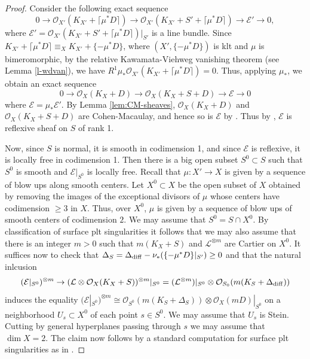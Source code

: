 \documentclass[12pt]{amsart}
\theoremstyle{plain}
\theoremstyle{remark}
\theoremstyle{definition}
\newcommand{\<}{\leq}
\def\>{\geq}
\newcommand{\OO}{{\mathcal{O}}}
\def\>{\geq}
\def\dim{\operatorname{dim}}
\theoremstyle{definition}
\theoremstyle{definition}
\numberwithin{equation}{section}
\theoremstyle{remark}
\begin{document}
\begin{proof}
    
     Consider the following exact sequence
    \[0\to \OO _{X'}(K_{X'}+\lceil \mu ^* D\rceil )\to \OO _{X'}(K_{X'}+S'+\lceil \mu ^* D\rceil )\to  \mathcal E'\to 0,\] 
    where $\mathcal E'=\OO _{X'}(K_{X'}+S'+\lceil \mu ^* D\rceil )|_{S'}$ is a line bundle.
    Since $K_{X'}+\lceil \mu ^* D\rceil\equiv _X K_{X'}+\{ -\mu ^*D \} $, where $(X',\{ -\mu ^*D \})$ is klt and $\mu$ is bimeromorphic,
    by the relative Kawamata-Viehweg vanishing theorem (see Lemma \ref{l-wdvan}), we have $R^1\mu _* \OO _{X'}(K_{X'}+\lceil \mu ^* D\rceil )=0$.
    Thus, applying $\mu _*$, we obtain an exact sequence
    \[0\to \OO _X(K_{X} +D)\to \OO _X(K_{X} +S+D)\to \mathcal E \to 0 \] where $\mathcal E =\mu _* \mathcal E'$.
     By Lemma \ref{lem:CM-sheaves}, $\OO _X(K_{X} +D)$ and $\OO _X(K_{X} +S+D)$ are Cohen-Macaulay, and hence so is $\mathcal E$ by \cite[Corollary 2.62(3)]{Kol13}. Thus by \cite[Proposition 1.3]{Har80}, $\mathcal E$ is reflexive sheaf on $S$ of rank 1.
  
Now, since $S$ is normal, it is smooth in codimension 1, and since $\mathcal E$ is reflexive, it is locally free in codimension 1.
Then there is a big open subset $S^0\subset S$ such that $S^0$ is smooth and $\mathcal E|_{S^0}$ is locally free.
 Recall that  $\mu:X'\to X$ is given by a sequence of blow ups along smooth centers. Let $X^0\subset X$ be the open subset of $X$ obtained by removing the images of the exceptional divisors of $\mu$ whose centers have codimension $\>3$ in $X$. Thus,  over $X^0$, $\mu$ is given by a sequence of blow ups of smooth centers of codimension $2$. We may assume that $S^0=S\cap  X^0$. By classification of surface plt singularities it follows that we may also assume that there is an integer $m>0$ such that $m(K_X+S)$ and $\mathcal L ^{\otimes m}$ are Cartier on $X^0$. 
It suffices now to check that $\Delta _S=\Delta _{\rm diff}-\nu_*(\{-\mu ^* D\}|_{S'})\geq 0$ and that the natural inlcusion \[(\mathcal E|_{S^0}) ^{\otimes m}\to (\mathcal L  \otimes \OO _X(K _X+S))^{\otimes m}|_{S^0}=(\mathcal L ^{\otimes m})|_{S^0}\otimes \OO _{S_0}(m(K_S+\Delta _{\rm diff}))\] induces the equality $(\mathcal E|_{S^0}) ^{\otimes m}\cong \OO _{S^0}(m(K_S+\Delta _S))\otimes \mathcal O _X(mD)|_{S^0}$  
on a neighborhood $U_s\subset X^0$ of each point $s\in S^0$.
We may assume that $U_s$ is Stein. Cutting by general hyperplanes passing through $s$ we may assume that $\dim X=2$. The claim now follows by a standard computation for surface plt singularities as in \cite[Lemma 3.3]{HW19}.
     

\end{proof}
\end{document}
